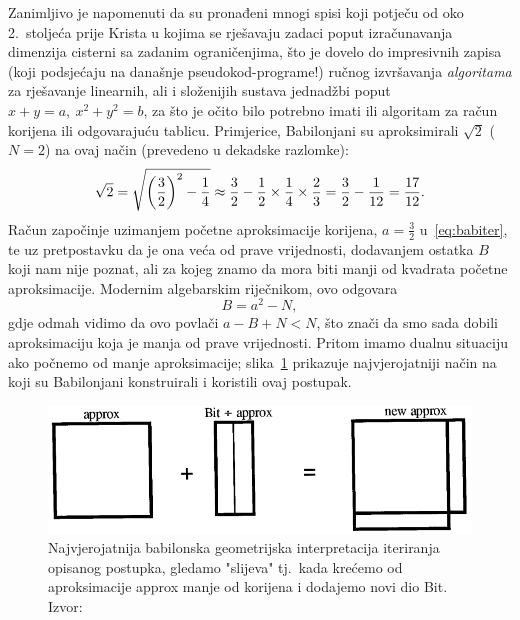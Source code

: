\documentclass[12pt]{scrartcl}
\begin{document}
Zanimljivo je napomenuti da su pronađeni mnogi spisi koji potječu od oko 2.~stoljeća prije Krista u kojima
se rješavaju zadaci poput izračunavanja dimenzija cisterni sa zadanim ograničenjima, što je dovelo do impresivnih zapisa (koji podsjećaju
na današnje pseudokod-programe!) ručnog izvršavanja
 \emph{algoritama} za rješavanje linearnih, ali i složenijih sustava jednadžbi poput $x+y=a,\ x^2+y^2=b$, za što je očito bilo potrebno
imati ili algoritam za račun korijena ili odgovarajuću tablicu. Primjerice, Babilonjani su aproksimirali $\sqrt 2$ ($N=2$) na ovaj način (prevedeno
u dekadske razlomke)\cite{fowler1998}:
\begin{equation}\label{eq:babiter}
    \sqrt 2 = \sqrt{\left(\frac32\right)^2 - \frac14}\approx\frac32 - \frac12\times\frac14\times\frac23 = \frac32 - \frac{1}{12} = \frac{17}{12}\text.
\end{equation}
Račun započinje uzimanjem početne aproksimacije korijena, $a=\frac32$ u~\eqref{eq:babiter}, te uz pretpostavku da je ona veća od prave vrijednosti,
dodavanjem ostatka $B$ koji nam nije poznat, ali za kojeg znamo da mora biti manji od kvadrata početne aproksimacije. Modernim algebarskim riječnikom,
ovo odgovara
\[
    B=a^2-N,
\]
gdje odmah vidimo da ovo povlači $a-B+N<N$, što znači da smo sada dobili aproksimaciju koja je manja od prave vrijednosti. Pritom imamo dualnu situaciju
ako počnemo od manje aproksimacije; slika~\ref{sl:babiter} prikazuje najvjerojatniji način na koji su Babilonjani konstruirali i koristili ovaj postupak.
\begin{figure}[h]
    \center
    \includegraphics[scale=0.5]{babiter}
    \caption{Najvjerojatnija babilonska geometrijska interpretacija iteriranja opisanog postupka, gledamo "slijeva" tj.\ kada krećemo od aproksimacije
    \textsf{approx} manje od korijena i dodajemo novi dio \textsf{Bit}. Izvor:~\cite{fowler1998}}\label{sl:babiter}
\end{figure}
\end{document}
